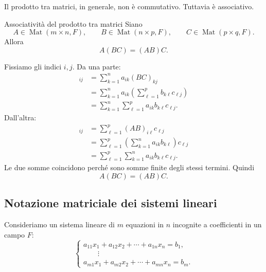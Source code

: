 \documentclass[a4paper]{article}
\begin{document}
Il prodotto tra matrici, in generale, non è commutativo. Tuttavia è associativo.

\begin{snippetproposition}{Associatività del prodotto tra matrici}
    Siano
    \[
        A\in\operatorname{Mat}(m\times n,F),
        \qquad
        B\in\operatorname{Mat}(n\times p,F),
        \qquad
        C\in\operatorname{Mat}(p\times q,F).
    \]
    Allora
    \[
        A(BC)=(AB)C.
    \]
\end{snippetproposition}

\begin{snippetproof}{}
    Fissiamo gli indici \(i,j\). Da una parte:
    \begin{align*}
        [A(BC)]_{ij}
        &=
        \sum_{k=1}^{n}a_{ik}(BC)_{kj}\\
        &=
        \sum_{k=1}^{n}a_{ik}
        \left(
            \sum_{\ell=1}^{p}b_{k\ell}c_{\ell j}
        \right)\\
        &=
        \sum_{k=1}^{n}\sum_{\ell=1}^{p}
        a_{ik}b_{k\ell}c_{\ell j}.
    \end{align*}
    Dall'altra:
    \begin{align*}
        [(AB)C]_{ij}
        &=
        \sum_{\ell=1}^{p}(AB)_{i\ell}c_{\ell j}\\
        &=
        \sum_{\ell=1}^{p}
        \left(
            \sum_{k=1}^{n}a_{ik}b_{k\ell}
        \right)c_{\ell j}\\
        &=
        \sum_{\ell=1}^{p}\sum_{k=1}^{n}
        a_{ik}b_{k\ell}c_{\ell j}.
    \end{align*}
    Le due somme coincidono perché sono somme finite degli stessi termini. Quindi
    \[
        A(BC)=(AB)C.
    \]
\end{snippetproof}

\subsection{Notazione matriciale dei sistemi lineari}

Consideriamo un sistema lineare di \(m\) equazioni in \(n\) incognite a coefficienti in un campo \(F\):
\[
    \begin{cases}
        a_{11}x_1+a_{12}x_2+\cdots+a_{1n}x_n=b_1,\\
        \qquad\vdots\\
        a_{m1}x_1+a_{m2}x_2+\cdots+a_{mn}x_n=b_m.
    \end{cases}
\]
\end{document}
